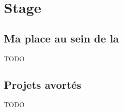 \chapter{Stage}

\section{Ma place au sein de la \abusys}

TODO













\section{Projets avortés}

TODO

